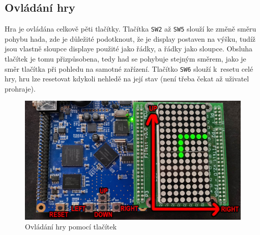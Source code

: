 \documentclass[a4paper, 11pt]{article}
\begin{document}
\subsection{Ovládání hry}
Hra je ovládána celkově pěti tlačítky. Tlačítka \verb|SW2| až \verb|SW5| slouží ke změně směru pohybu hada,
zde je důležité podotknout, že je display postaven na výšku, tudíž jsou vlastně sloupce displaye
použité jako řádky, a řádky jako sloupce. Obsluha tlačítek je tomu přizpůsobena,
tedy had se pohybuje stejným směrem, jako je směr tlačítka při pohledu na samotné zařízení.
Tlačítko \verb|SW6| slouží k~resetu celé hry, hru lze resetovat kdykoli nehledě na její stav
(není třeba čekat až uživatel prohraje).
\begin{figure}[h!]
    \centering
    \includegraphics[width=1.0\linewidth]{conts.jpg}
    \caption{Ovládání hry pomocí tlačítek}
\end{figure}
\end{document}
